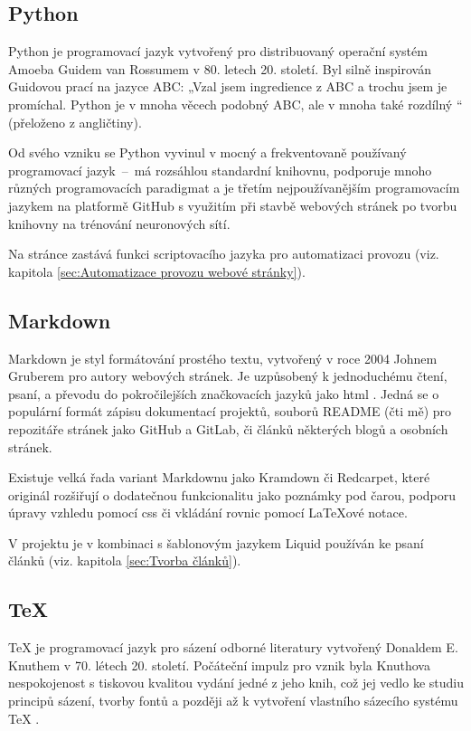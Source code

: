 \documentclass[a4paper, 12pt]{article}
\newcommand*{\fullref}[1]{\hyperref[{#1}]{\ref*{#1}}}
\begin{document}
  \subsection{Python} \label{sec:Python}
  Python je programovací jazyk vytvořený pro distribuovaný operační systém Amoeba Guidem van Rossumem v 80. letech 20. století. Byl silně inspirován Guidovou prací na jazyce ABC: „Vzal jsem ingredience z ABC a trochu jsem je promíchal. Python je v mnoha věcech podobný ABC, ale v mnoha také rozdílný \cite{making-of-python}“ (přeloženo z angličtiny).

  Od svého vzniku se Python vyvinul v mocný a frekventovaně používaný programovací jazyk~--~má rozsáhlou standardní knihovnu, podporuje mnoho různých programovacích paradigmat a je třetím nejpoužívanějším programovacím jazykem na platformě GitHub \cite{github-statistics} s využitím při stavbě webových stránek po tvorbu knihovny na trénování neuronových sítí.

  Na stránce zastává funkci scriptovacího jazyka pro automatizaci provozu (viz. kapitola \fullref{sec:Automatizace provozu webové stránky}).


  \subsection{Markdown} \label{sec:Markdown}
  Markdown je styl formátování prostého textu, vytvořený v roce 2004 Johnem Gruberem pro autory webových stránek. Je uzpůsobený k jednoduchému čtení, psaní, a převodu do pokročilejších značkovacích jazyků jako \gls{html} \cite{markdown-history}. Jedná se o populární formát zápisu dokumentací projektů, souborů README (čti mě) pro repozitáře stránek jako GitHub a GitLab, či článků některých blogů a osobních stránek.

  Existuje velká řada variant Markdownu jako Kramdown či Redcarpet, které originál rozšiřují o dodatečnou funkcionalitu jako poznámky pod čarou, podporu úpravy vzhledu pomocí \gls{css} či vkládání rovnic pomocí \LaTeX ové notace.

  V projektu je v kombinaci s šablonovým jazykem Liquid používán ke psaní článků (viz. kapitola \fullref{sec:Tvorba článků}).


  \subsection{\TeX} \label{sec:TeX}
  \TeX{} je programovací jazyk pro sázení odborné literatury vytvořený Donaldem E. Knuthem v 70. létech 20. století. Počáteční impulz pro vznik byla Knuthova nespokojenost s tiskovou kvalitou vydání jedné z jeho knih, což jej vedlo ke studiu principů sázení, tvorby fontů a později až k vytvoření vlastního sázecího systému \TeX{} \cite{tex-history}.
\end{document}
